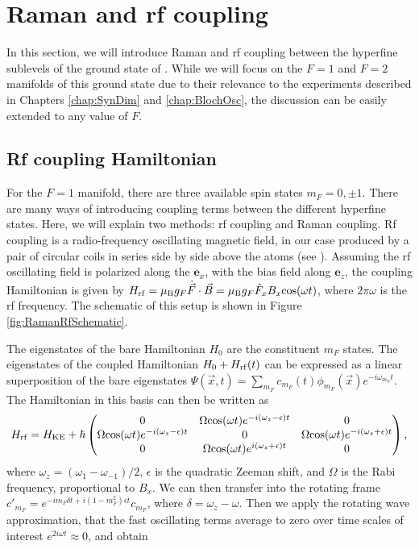 \section{Raman and rf coupling}\label{sec:RamanRf}

In this section, we will introduce Raman and rf coupling between the hyperfine sublevels of the ground state of \Rb{}. While we will focus on the $F=1$ and $F=2$ manifolds of this ground state due to their relevance to the experiments described in Chapters \ref{chap:SynDim} and \ref{chap:BlochOsc}, the discussion can be easily extended to any value of $F$. 

\subsection{Rf coupling Hamiltonian}

	For the $F=1$ manifold, there are three available spin states $m_F = 0,\pm1$. There are many ways of introducing coupling terms between the different hyperfine states. Here, we will explain two methods: rf coupling and Raman coupling. Rf coupling is a radio-frequency oscillating magnetic field, in our case produced by a pair of circular coils in series side by side above the atoms (see \cite{KarinaThesis}). Assuming the rf oscillating field is polarized along the $\mathbf{e}_x$, with the bias field along $\mathbf{e}_z$, the coupling Hamiltonian is given by $H_{\rm rf} = \mu_{\rm B} g_F \hat{\vec{F}}\cdot{}\vec{B} = \mu_{\rm B} g_F \hat{F}_x B_x {\rm cos}(\omega t)$, where $2 \pi\omega$ is the rf frequency. The schematic of this setup is shown in Figure \ref{fig:RamanRfSchematic}.

The eigenstates of the bare Hamiltonian $H_0$ are the constituent $m_F$ states. The eigenstates of the coupled Hamiltonian $H_0 + H_{\rm rf}(t)$ can be expressed as a linear superposition of the bare eigenstates $\Psi(\vec{x},t)=\sum_{m_F}c_{m_F}(t)\phi_{m_F}(\vec{x})e^{-i\omega_{m_F}t}$. The Hamiltonian in this basis can then be written as\cite{LCT}
\begin{equation}
H_{\rm rf} = H_{\rm KE} + \hbar
 \begin{pmatrix} 0 & \Omega {\rm cos}(\omega t)e^{-i(\omega_z-\epsilon)t}  & 0  \\ 
\Omega {\rm cos}(\omega t)e^{-i(\omega_z - \epsilon)t}  & 0 &  \Omega {\rm cos}(\omega t)e^{-i(\omega_z + \epsilon)t} \\
 0 & \Omega {\rm cos}(\omega t)e^{i(\omega_z + \epsilon)t}  & 0  \\
 \end{pmatrix} \\,
\end{equation}
where $\omega_z = (\omega_1-\omega_{-1})/2$, $\epsilon$ is the quadratic Zeeman shift, and $\Omega$ is the Rabi frequency, proportional to $B_x$.
	 We can then transfer into the rotating frame $c'_{m_F} = e^{-i m_F \delta t +i(1-m_F^2)\epsilon t}c_{m_F}$, where $\delta = \omega_z - \omega$. Then we apply the rotating wave approximation, that the fast oscillating terms average to zero over time scales of interest $e^{2i\omega t}\approx 0$, and obtain 

